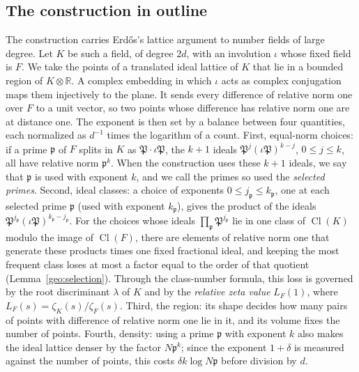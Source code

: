 \documentclass[11pt]{amsart}
\numberwithin{equation}{section}
\theoremstyle{definition}
\theoremstyle{remark}
\DeclareMathOperator{\Cl}{Cl}
\newcommand{\R}{\mathbb R}
\begin{document}
\subsection{The construction in outline}\label{intro:outline}
The construction carries Erd\H{o}s's lattice argument to number fields
of large degree. Let $K$ be such a field, of degree $2d$, with an
involution $\iota$ whose fixed field is $F$. We take the points of a
translated ideal lattice of $K$ that lie in a bounded region of
$K\otimes\R$. A complex embedding in which $\iota$ acts as complex
conjugation maps them injectively to the plane. It sends every
difference of relative norm one over $F$ to a unit vector, so two points
whose difference has relative norm one are at distance one. The
exponent is then set by a balance between four quantities, each
normalized as $d^{-1}$ times the logarithm of a count. First,
equal-norm choices: if a prime $\mathfrak p$ of $F$ splits in $K$ as
$\mathfrak P\cdot\iota\mathfrak P$, the $k+1$ ideals
$\mathfrak P^j(\iota\mathfrak P)^{k-j}$, $0\le j\le k$, all have
relative norm $\mathfrak p^k$. When the construction uses these $k+1$
ideals, we say that $\mathfrak p$ is used with exponent $k$, and we call
the primes so used the \emph{selected primes}. Second, ideal classes:
a choice of exponents $0\le j_{\mathfrak p}\le k_{\mathfrak p}$, one at
each selected prime $\mathfrak p$ (used with exponent $k_{\mathfrak p}$),
gives the product of the ideals
$\mathfrak P^{j_{\mathfrak p}}(\iota\mathfrak P)^{k_{\mathfrak p}-j_{\mathfrak p}}$.
For the choices whose ideals $\prod_{\mathfrak p}\mathfrak P^{j_{\mathfrak p}}$
lie in one class of $\Cl(K)$ modulo the image of $\Cl(F)$, there are
elements of relative norm one that generate these products times one
fixed fractional ideal, and keeping the most frequent class loses at
most a factor equal to the order of that quotient
(Lemma~\ref{geo:selection}).
Through the class-number formula, this loss is governed by the root
discriminant $\lambda$ of $K$ and by the \emph{relative zeta value}
$L_F(1)$, where $L_F(s)=\zeta_K(s)/\zeta_F(s)$. Third, the region: its
shape decides how many pairs of points with difference of relative norm
one lie in it, and its volume fixes the number of points. Fourth,
density: using a prime $\mathfrak p$ with exponent $k$ also makes the
ideal lattice denser by the factor $N\mathfrak p^k$; since the exponent
$1+\delta$ is measured against the number of points, this costs
$\delta k\log N\mathfrak p$ before division by $d$.
\end{document}
